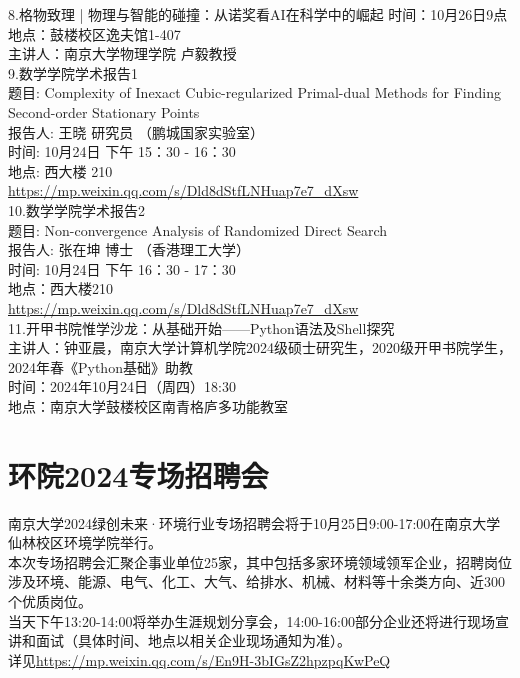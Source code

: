 \documentclass[letterpaper, 12pt]{article}
\begin{document}
\begin{multicols}{2}
8.格物致理 | 物理与智能的碰撞：从诺奖看AI在科学中的崛起
时间：10月26日9点\\
地点：鼓楼校区逸夫馆1-407\\
主讲人：南京大学物理学院 卢毅教授\\




9.数学学院学术报告1\\
题目: Complexity of Inexact Cubic-regularized Primal-dual Methods for Finding Second-order Stationary Points\\
报告人: 王晓 研究员 （鹏城国家实验室）\\
时间: 10月24日 下午 15：30 - 16：30\\
地点: 西大楼 210\\
\url{https://mp.weixin.qq.com/s/Dld8dStfLNHuap7e7_dXsw}\\


10.数学学院学术报告2\\
题目: Non-convergence Analysis of Randomized Direct Search\\
报告人: 张在坤 博士 （香港理工大学）\\
时间: 10月24日 下午 16：30 - 17：30\\
地点：西大楼210\\
\url{https://mp.weixin.qq.com/s/Dld8dStfLNHuap7e7_dXsw}\\

11.开甲书院惟学沙龙：从基础开始——Python语法及Shell探究\\
主讲人：钟亚晨，南京大学计算机学院2024级硕士研究生，2020级开甲书院学生，2024年春《Python基础》助教\\
时间：2024年10月24日（周四）18:30\\
地点：南京大学鼓楼校区南青格庐多功能教室\\

\section{环院2024专场招聘会}
南京大学2024绿创未来·环境行业专场招聘会将于10月25日9:00-17:00在南京大学仙林校区环境学院举行。
\\
本次专场招聘会汇聚企事业单位25家，其中包括多家环境领域领军企业，招聘岗位涉及环境、能源、电气、化工、大气、给排水、机械、材料等十余类方向、近300个优质岗位。\\
当天下午13:20-14:00将举办生涯规划分享会，14:00-16:00部分企业还将进行现场宣讲和面试（具体时间、地点以相关企业现场通知为准）。\\
详见\url{https://mp.weixin.qq.com/s/En9H-3bIGsZ2hpzpqKwPeQ}\\

\end{multicols}
\end{document}
